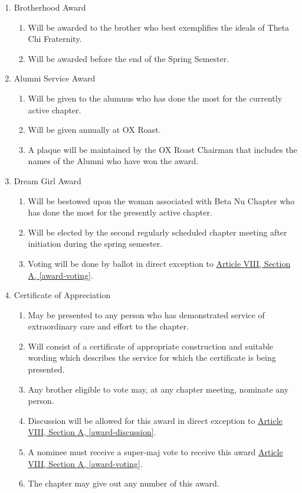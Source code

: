 	\begin{enumerate}
		\item Brotherhood Award

			\begin{enumerate}
				\item Will be awarded to the brother who best exemplifies the ideals of Theta Chi Fraternity.
				\item Will be awarded before the end of the Spring Semester.
			\end{enumerate}

		\item Alumni Service Award
			\begin{enumerate}
				\item Will be given to the alumnus who has done the most for the currently active chapter.
				\item Will be given annually at OX Roast.
				\item A plaque will be maintained by the OX Roast Chairman that includes the names of the Alumni who have won the award.
			\end{enumerate}

		\item Dream Girl Award
			\label{dream-girl-award}
			
			\begin{enumerate}
				\item Will be bestowed upon the woman associated with Beta Nu Chapter who has done the most for the presently active chapter.
				\item Will be elected by the second regularly scheduled chapter meeting after initiation during the spring semester.
				\item Voting will be done by ballot in direct exception to \hyperref[award-voting]{Article VIII, Section A, \autoref*{award-voting}}.
			\end{enumerate}

		\item Certificate of Appreciation
			
			\begin{enumerate}
				\item May be presented to any person who has demonstrated service of extraordinary care and effort to the chapter.
				\item Will consist of a certificate of appropriate construction and suitable wording which describes the service for which the certificate is being presented.
				\item Any brother eligible to vote may, at any chapter meeting, nominate any person.
				\item Discussion will be allowed for this award in direct exception to \hyperref[award-discussion]{Article VIII, Section A, \autoref*{award-discussion}}.
				\item A nominee must receive a \gls{super-maj} vote to receive this award \hyperref[award-voting]{Article VIII, Section A, \autoref*{award-voting}}.
				\item The chapter may give out any number of this award.
			\end{enumerate}


\end{enumerate}
